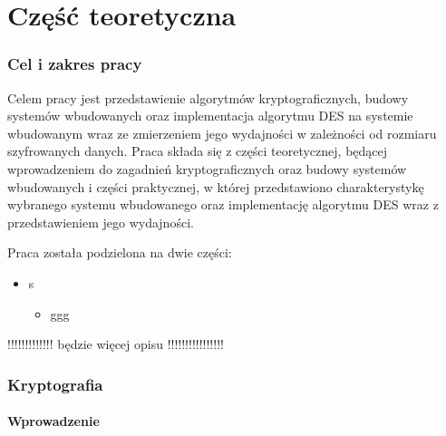 \documentclass[12p]{article}
\begin{document}
\tableofcontents
\newpage
\part{Część teoretyczna}
\section{Cel i zakres pracy}


\quad Celem pracy jest przedstawienie algorytmów kryptograficznych, budowy systemów wbudowanych oraz implementacja algorytmu DES na systemie wbudowanym wraz ze zmierzeniem jego wydajności w zależności od rozmiaru szyfrowanych danych. Praca składa się z części teoretycznej, będącej wprowadzeniem do zagadnień kryptograficznych oraz budowy systemów wbudowanych i części praktycznej, w której przedstawiono charakterystykę wybranego systemu wbudowanego oraz implementację algorytmu DES wraz z przedstawieniem jego wydajności.

\quad Praca została podzielona na dwie części:
\begin{itemize}
\item s
\begin{itemize}
\item ggg
\end{itemize}
\end{itemize}  
!!!!!!!!!!!!! będzie więcej opisu !!!!!!!!!!!!!!!!

\newpage
\section{Kryptografia}
\subsection{Wprowadzenie}
\end{document}
